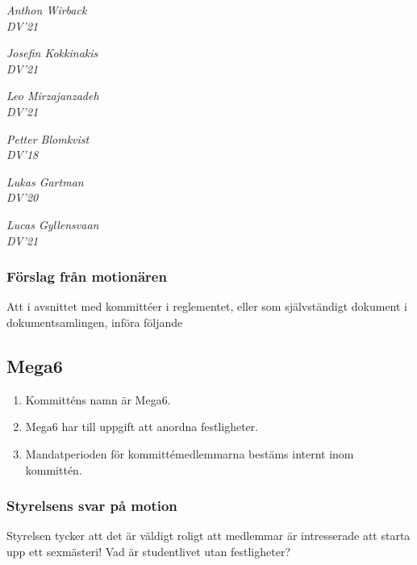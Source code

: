 \documentclass[protokoll]{dvd}
\begin{document}
    \emph{Anthon Wirback\\DV'21}

    \emph{Josefin Kokkinakis\\DV'21}

    \emph{Leo Mirzajanzadeh\\DV'21}

    \emph{Petter Blomkvist\\DV'18}

    \emph{Lukas Gartman\\DV'20}

    \emph{Lucas Gyllensvaan\\DV'21}


    \subsubsection*{Förslag från motionären}

    \begin{attsatser}
        \item Att i avsnittet med kommittéer i reglementet, eller som självständigt dokument i dokumentsamlingen, införa följande

        \begin{displayquote}
            \subsection*{Mega6}
            \begin{enumerate}[label=\arabic* §]
                \item Kommitténs namn är Mega6.

                \item Mega6 har till uppgift att anordna festligheter.

                \item Mandatperioden för kommittémedlemmarna bestäms internt inom kommittén.
            \end{enumerate}
        \end{displayquote}
    \end{attsatser}

    \subsubsection*{Styrelsens svar på motion}
    Styrelsen tycker att det är väldigt roligt att medlemmar är intresserade att starta upp ett sexmästeri!
    Vad är studentlivet utan festligheter?
\end{document}

